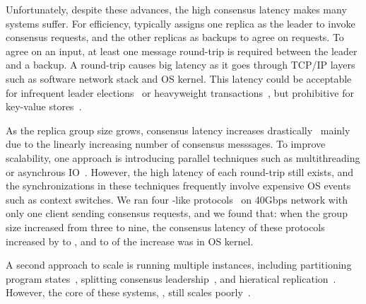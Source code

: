 Unfortunately, despite these advances, the high \paxos consensus latency makes 
many systems suffer. For efficiency, \paxos typically assigns one replica as 
the leader to invoke consensus requests, and the other replicas as backups to 
agree on requests. To agree on an input, at least one message round-trip is 
required between the leader and a backup. A round-trip causes big latency as it 
goes through TCP/IP layers such as software network stack and OS kernel. This 
latency could be acceptable for infrequent 
leader elections~\cite{chubby:osdi,zookeeper} or 
heavyweight transactions~\cite{crane:sosp15,eve:osdi12}, but prohibitive for 
key-value stores~\cite{redis,memcached}.


As the replica group size grows, \paxos consensus latency increases 
drastically~\cite{scatter:sosp11} mainly due to the linearly 
increasing number of consensus messsages. To improve scalability, 
one approach is introducing parallel techniques such as multithreading or 
asynchrous IO~\cite{zookeeper, crane:sosp15}. However, the high latency of each 
round-trip still exists, and the synchronizations in these techniques 
frequently involve expensive OS events such as context switches. We ran four 
\paxos-like protocols~\cite{zookeeper, crane:sosp15, spaxos, libpaxos} on 40Gbps 
network with only one client sending consensus requests, and we found that: when 
the group size increased from three to nine, the consensus latency of these 
protocols increased by \tradlatencyincreaselow to \tradlatencyincreasehigh, and 
\systemcostlow to \systemcosthigh of the increase was in OS kernel. 

A second approach to scale \paxos is running multiple \paxos instances, 
including partitioning program states~\cite{scatter:sosp11,dssmr,ssmr}, 
splitting consensus leadership~\cite{mencius:osdi08,spaxos}, and hieratical 
replication~\cite{manos:hotdep10,scatter:sosp11}. However, the core of 
these systems, \paxos, still 
scales poorly~\cite{ellis:thesis,scatter:sosp11,manos:hotdep10}.

